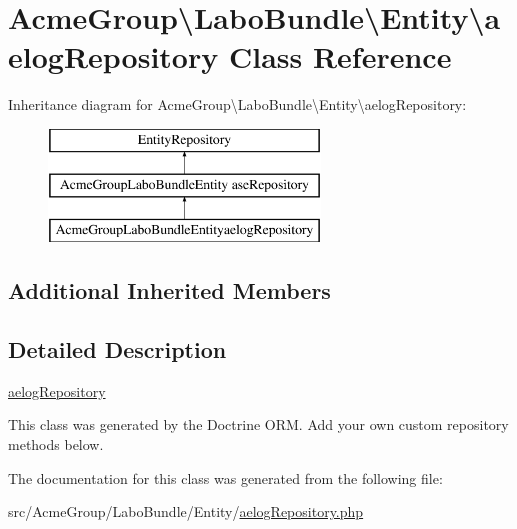 \hypertarget{class_acme_group_1_1_labo_bundle_1_1_entity_1_1aelog_repository}{\section{Acme\+Group\textbackslash{}Labo\+Bundle\textbackslash{}Entity\textbackslash{}aelog\+Repository Class Reference}
\label{class_acme_group_1_1_labo_bundle_1_1_entity_1_1aelog_repository}
}
Inheritance diagram for Acme\+Group\textbackslash{}Labo\+Bundle\textbackslash{}Entity\textbackslash{}aelog\+Repository\+:\begin{figure}[H]
\begin{center}
\leavevmode
\includegraphics[height=3.000000cm]{class_acme_group_1_1_labo_bundle_1_1_entity_1_1aelog_repository}
\end{center}
\end{figure}
\subsection*{Additional Inherited Members}


\subsection{Detailed Description}
\hyperlink{class_acme_group_1_1_labo_bundle_1_1_entity_1_1aelog_repository}{aelog\+Repository}

This class was generated by the Doctrine O\+R\+M. Add your own custom repository methods below. 

The documentation for this class was generated from the following file\+:\begin{DoxyCompactItemize}
\item 
src/\+Acme\+Group/\+Labo\+Bundle/\+Entity/\hyperlink{aelog_repository_8php}{aelog\+Repository.\+php}\end{DoxyCompactItemize}
